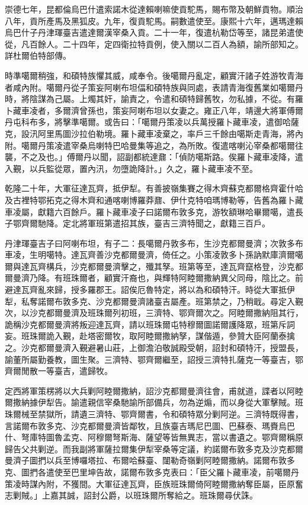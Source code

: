 \begin{pinyinscope}
崇德七年，昆都倫烏巴什遣索諾木從達賴喇嘛使貢駝馬，賜布幣及朝鮮貢物。順治八年，貢所產馬及黑狐皮。九年，復貢駝馬。嗣數遣使至。康熙十六年，邁瑪達賴烏巴什子丹津琿臺吉遣達爾漢宰桑入貢。二十一年，復遣杭勒岱等至，諸昆弟遣使從，凡百餘人。二十四年，定四衛拉特貢例，使入關以二百人為額，諭所部知之。詳杜爾伯特部傳。

時準噶爾稍強，和碩特族懼其威，咸奉令。後噶爾丹亂定，顧實汗諸子姓游牧青海者咸內附。噶爾丹從子策妄阿喇布坦偪和碩特族與同處，表請青海復舊業如噶爾丹時，將陰謀為己屬。上燭其奸，諭責之，令遣和碩特歸舊牧，勿私據，不從。有羅卜藏車凌者，多爾濟曾孫也，策妄阿喇布坦以女妻之。雍正八年，靖邊大將軍傅爾丹屯科布多，將擊準噶爾。或告曰：「噶爾丹策凌以兵萬授羅卜藏車凌，遣御哈薩克，設汛阿里馬圖沙拉伯勒境。羅卜藏車凌棄之，率戶三千餘由噶斯走青海，將內附。噶爾丹策凌遣宰桑烏喇特巴哈曼集等追之，為所敗。復遣喀喇沁宰桑都噶爾往襲，不之及也。」傅爾丹以聞，詔副都統達鼐：「偵防噶斯路。俟羅卜藏車凌降，遣入覲，以兵監從眾，置內汛，勿墮詭降計。」久之，羅卜藏車凌不至。

乾隆二十年，大軍征達瓦齊，抵伊犁。有善披嶺集賽之得木齊蘇克都爾格齊霍什哈及古裡特鄂拓克之得木齊和通喀喇博羅莽鼐、伊什克特咱瑪博勒等，告舊為羅卜藏車凌屬，獻籍六百餘戶。羅卜藏車凌子曰諾爾布敦多克，游牧額琳哈畢爾噶，遣長子鄂齊爾馳降。定北將軍班第遣招其族，臺吉三濟特聞之，獻籍三百戶。

丹津琿臺吉子曰阿喇布坦，有子二：長噶爾丹敦多布，生沙克都爾曼濟；次敦多布車凌，生明噶特。達瓦齊善沙克都爾曼濟，倚任之。小策凌敦多卜孫訥默庫濟爾噶爾與達瓦齊構兵，沙克都爾曼濟擊之，殲其孥。班第等至，達瓦齊竄格登，沙克都爾曼濟乃降。有班珠爾者，顧實汗裔也，與輝特阿睦爾撒納異父同母，陰比之。前避達瓦齊亂來歸，授多羅郡王。詔俟厄魯特定，將以為和碩特汗。時從大軍抵伊犁，私奪諾爾布敦多克、沙克都爾曼濟諸臺吉屬產。班第禁之，乃稍戢。尋定入覲次，以沙克都爾曼濟及班珠爾列初班，三濟特、鄂齊爾次之。阿睦爾撒納阻其行，詭稱沙克都爾曼濟將叛迎達瓦齊，請以班珠爾屯特穆爾圖諾爾護降眾，班第斥詞妄。班珠爾詭入覲，赴塔密爾牧，取阿睦爾撒納孥，謀偕遁，參贊大臣阿蘭泰擒之。沙克都爾曼濟入覲避暑山莊，上御澹泊敬誠殿受朝，詔封和碩特汗，授盟長，諭董所屬勤養教，圖生聚。三濟特、鄂齊爾繼至，詔授三濟特扎薩克一等臺吉，鄂齊爾閒散一等臺吉，遣歸牧。

定西將軍策楞將以大兵剿阿睦爾撒納，詔沙克都爾曼濟往會，甫就道，諜者以阿睦爾撒納據伊犁告。諭遣親信宰桑馳諭所部備兵，勿為逆煽，而以身從大軍擊賊。班珠爾械至禁獄所，請遺三濟特、鄂齊爾書，令和碩特眾分剿阿逆。三濟特既得書，言諾爾布敦多克、沙克都爾曼濟皆鄰牧，且族臺吉瑪尼巴圖、巴蘇泰、瑪賚烏巴什、弩庫特圖魯孟克、阿穆爾弩斯海、薩望等皆無異志，當以書遺之。鄂齊爾稱原歸告父共剿逆。而我副將軍薩拉爾集伊犁宰桑等定議，約諾爾布敦多克及沙克都爾曼濟子圖捫以兵至博囉塔拉、布爾哈蘇臺、闥勒奇嶺剿阿睦爾撒納。諾爾布敦多克、圖捫各遣使至巴里坤告故，諾爾布敦多克表曰：「臣父羅卜藏車凌，前噶爾丹策凌時謀內附，不獲間。大軍征達瓦齊，臣族班珠爾倚阿睦爾撒納奪臣屬，臣原奮志剿賊。」上嘉其誠，詔封公爵，以班珠爾所奪給之。班珠爾尋伏誅。


\end{pinyinscope}
